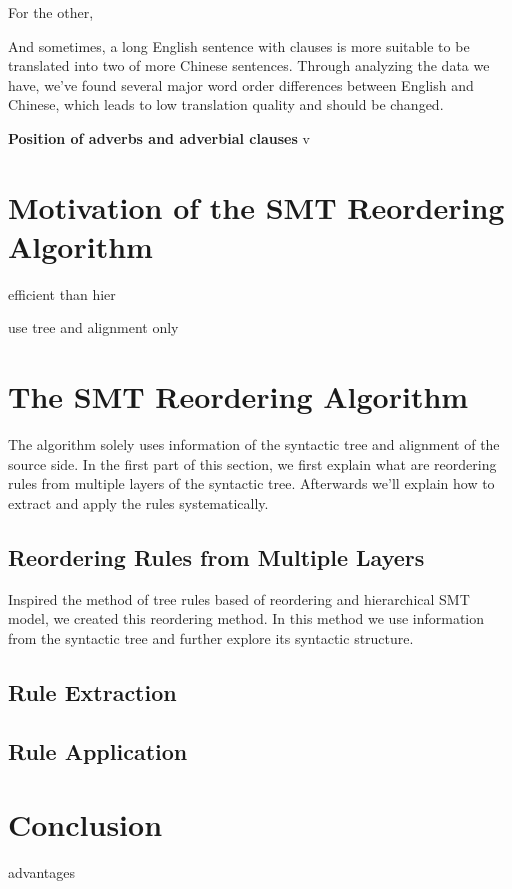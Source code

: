 For the other, 

And sometimes, a long English sentence with clauses is more suitable to be translated into two of more Chinese sentences. Through analyzing the data we have, we've found several major word order differences between English and Chinese, which leads to low translation quality and should be changed. 

\textbf{Position of adverbs and adverbial clauses} v
\section{Motivation of the SMT Reordering Algorithm}
\label{ch:ReorderingApproach:sec:Motivation}




efficient than hier

use tree and alignment only

\section{The SMT Reordering Algorithm}
\label{ch:ReorderingApproach:sec:Algorithm}


The algorithm solely uses information of the syntactic tree and alignment of the source side. In the first part of this section, we first explain what are reordering rules from multiple layers of the syntactic tree. Afterwards we'll explain how to extract and apply the rules systematically.

\subsection{Reordering Rules from Multiple Layers}

Inspired the method of tree rules based of reordering and hierarchical SMT model, we created this reordering method. In this method we use information from the syntactic tree and further explore its syntactic structure. 



\subsection{Rule Extraction}



\subsection{Rule Application}

\section{Conclusion}

advantages